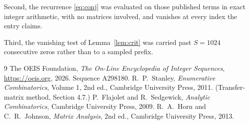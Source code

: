 \documentclass[11pt,a4paper]{article}
\theoremstyle{plain}
\theoremstyle{definition}
\begin{document}
Second, the recurrence \eqref{eq:conj} was evaluated on those published terms in exact
integer arithmetic, with no matrices involved, and vanishes at every index the entry claims.

Third, the vanishing test of Lemma~\ref{lem:crit} was carried past $S=1024$ consecutive
zeros rather than to a sampled prefix.

\begin{thebibliography}{9}
 The OEIS Foundation, \emph{The On-Line Encyclopedia of Integer
Sequences}, \url{https://oeis.org}, 2026. Sequence A298180.
 R.~P.~Stanley, \emph{Enumerative Combinatorics}, Volume 1, 2nd ed.,
Cambridge University Press, 2011. (Transfer-matrix method, Section 4.7.)
 P.~Flajolet and R.~Sedgewick, \emph{Analytic Combinatorics}, Cambridge
University Press, 2009.
 R.~A.~Horn and C.~R.~Johnson, \emph{Matrix Analysis}, 2nd ed., Cambridge
University Press, 2013.
\end{thebibliography}
\end{document}
